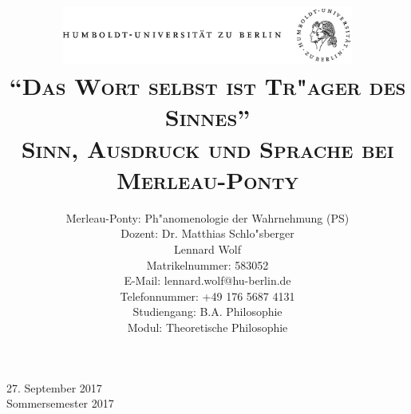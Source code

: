 \documentclass[a4paper, 12pt]{article}
\date{\vspace{-3ex}}
\begin{document}
\title{\vspace{5ex}
	\includegraphics*[bb=0 0 720 200, width=0.72\textwidth]{ErstesSem/images/hu_logo.png}\\
	\vspace{30pt}
	\scshape\LARGE{"`Das Wort selbst ist Tr"ager des Sinnes"'}\\\Large{Sinn, Ausdruck und Sprache bei Merleau-Ponty}\\\vspace{20pt}}
	


\author{Merleau-Ponty: Ph"anomenologie der Wahrnehmung (PS)\\
	\vspace{7pt}
          Dozent: Dr. Matthias Schlo"sberger\\\vspace{4pt}Lennard Wolf\\
        \small{Matrikelnummer: 583052}\\
        \small{E-Mail: lennard.wolf@hu-berlin.de}\\
        \small{Telefonnummer: +49 176 5687 4131}\\
        \small{Studiengang: B.A. Philosophie}\\
        \small{Modul: Theoretische Philosophie}}


\maketitle

\vspace{\fill}

\begin{minipage}[]{0.92\textwidth}
    \centering
    \onehalfspacing
    \large   
    27. September 2017\\
    Sommersemester 2017

    \vspace{-20mm} 
\end{minipage}%
\thispagestyle{empty}
\newpage
\setcounter{page}{1}
\end{document}
